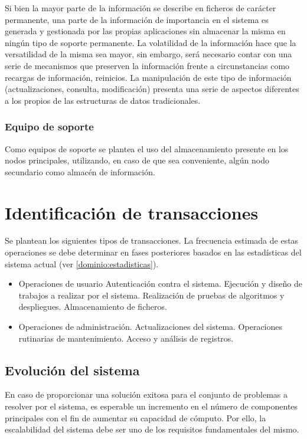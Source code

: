 Si bien la mayor parte de la información se describe en ficheros de carácter permanente, una parte de la información de importancia en el sistema es generada y gestionada por las propias aplicaciones sin almacenar la misma en ningún tipo de soporte permanente. La volatilidad de la información hace que la versatilidad de la misma sea mayor, sin embargo, será necesario contar con una serie de mecanismos que preserven la información frente a circunstancias como recargas de información, reinicios. La manipulación de este tipo de información (actualizaciones, consulta, modificación) presenta una serie de aspectos diferentes a los propios de las estructuras de datos tradicionales.

\subsubsection{Equipo de soporte}

Como equipos de soporte se plantea el uso del almacenamiento presente en los nodos principales, utilizando, en caso de que sea conveniente, algún nodo secundario como almacén de información.

\section{Identificación de transacciones}

Se plantean los siguientes tipos de transacciones. La frecuencia estimada de estas operaciones se debe determinar en fases posteriores basados en las estadísticas del sistema actual (ver \ref{dominio:estadisticas}).

\begin{itemize}
  \item Operaciones de usuario
    \subitem Autenticación contra el sistema.
    \subitem Ejecución y diseño de trabajos a realizar por el sistema.
    \subitem Realización de pruebas de algoritmos y despliegues.
    \subitem Almacenamiento de ficheros.
  \item Operaciones de administración.
    \subitem Actualizaciones del sistema.
    \subitem Operaciones rutinarias de mantenimiento.
    \subitem Acceso y análisis de registros.
\end{itemize}

\subsection{Evolución del sistema}

En caso de proporcionar una solución exitosa para el conjunto de problemas a resolver por el sistema, es esperable un incremento en el número de componentes principales con el fin de aumentar su capacidad de cómputo. Por ello, la escalabilidad del sistema debe ser uno de los requisitos fundamentales del mismo.

